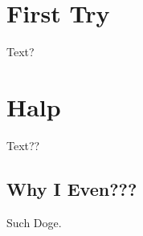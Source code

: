 \documentclass[11pt]{easyarticle}
\begin{document}
\medskip

\thispagestyle{plain}
\begin{center}                  %
{\Large \doctitle} \\
\docauthor \\
\end{center}

\section{First Try}
Text?
\section{Halp}
Text??
\subsection{Why I Even???}
Such Doge.
\end{document}

